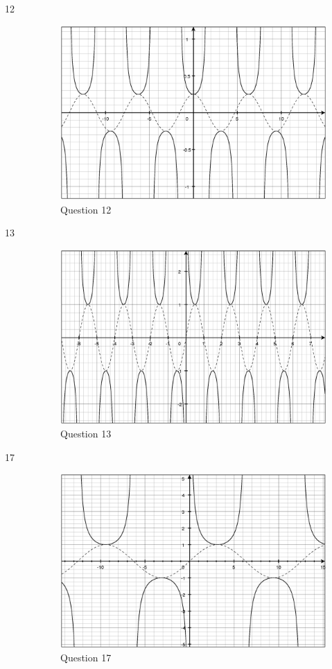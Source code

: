 \documentclass[fleqn,addpoints]{exam}
\begin{document}
\begin{description}
\item[12]
\begin{figure}[H]
  \centering
  \includegraphics[scale=.3]{question_4.6_12.eps}
  \caption*{Question 12}
\end{figure}

\item[13]
\begin{figure}[H]
  \centering
  \includegraphics[scale=.3]{question_4.6_13.eps}
  \caption*{Question 13}
\end{figure}

\item[17]
\begin{figure}[H]
  \centering
  \includegraphics[scale=.3]{question_4.6_17.eps}
  \caption*{Question 17}
\end{figure}


\end{description}
\end{document}
